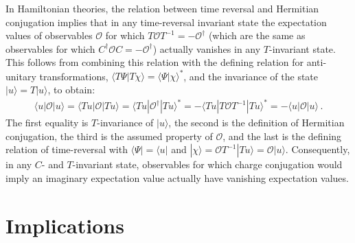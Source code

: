 \documentclass [12pt]{article}
\begin{document}
In Hamiltonian theories, the relation between time reversal and Hermitian conjugation
implies that in any time-reversal invariant state
the expectation values of observables $\mathcal O$ for which
$
    T \mathcal O T^{-1} = - \mathcal O^\dagger
$
(which are the same as observables for which
$
    C^\dagger \mathcal O C = - \mathcal O^\dagger
$)
actually vanishes in any $T$-invariant state.
This follows from combining this relation with
the defining relation for anti-unitary transformations,
$
    \langle T \Psi | T \chi \rangle
    =
    \langle \Psi | \chi \rangle^*
$,
and the invariance of the state
$
    |u\rangle = T |u \rangle
$,
to obtain:
\begin{align}
    \langle u | \mathcal O | u \rangle
    =
    \langle T u | \mathcal O | T u \rangle
    =
    \langle T u | \mathcal O^\dagger | T u \rangle^*
    =
    - \langle T u | T \mathcal O T^{-1} | T u \rangle^*
    =
    - \langle u | \mathcal O | u \rangle \,.
\end{align}
The first equality is $T$-invariance of $|u\rangle$,
the second is the definition of Hermitian conjugation,
the third is the assumed property of $\mathcal O$,
and the last is the defining relation of time-reversal
with $\langle \Psi| = \langle u|$ and
$|\chi\rangle = \mathcal O T^{-1}|T u\rangle = \mathcal O |u\rangle$.
Consequently, in any $C$- and $T$-invariant state, observables for which
charge conjugation would imply an imaginary expectation value actually have
vanishing expectation values.

\section {Implications}\label{sec:Consequences}
\end{document}
